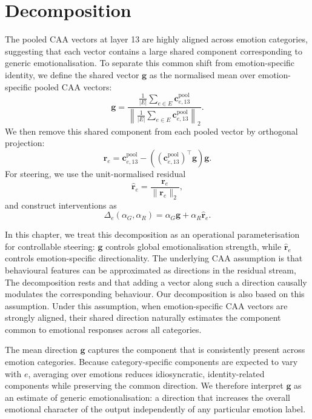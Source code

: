 \section{Decomposition}
\label{sec:decomposition}

The pooled CAA vectors at layer 13 are highly aligned across emotion categories, suggesting that each vector contains a large shared component corresponding to generic emotionalisation. To separate this common shift from emotion-specific identity, we define the shared vector $\mathbf{g}$ as the normalised mean over emotion-specific pooled CAA vectors:
\[
\mathbf{g}=
\frac{\frac{1}{|E|}\sum_{e\in E}\mathbf{c}^{\mathrm{pool}}_{e,13}}
{\left\lVert\frac{1}{|E|}\sum_{e\in E}\mathbf{c}^{\mathrm{pool}}_{e,13}\right\rVert_2}.
\]
We then remove this shared component from each pooled vector by orthogonal projection:
\[
\mathbf{r}_e=\mathbf{c}^{\mathrm{pool}}_{e,13}-\left((\mathbf{c}^{\mathrm{pool}}_{e,13})^\top \mathbf{g}\right)\mathbf{g}.
\]
For steering, we use the unit-normalised residual
\[
\hat{\mathbf{r}}_e=\frac{\mathbf{r}_e}{\lVert\mathbf{r}_e\rVert_2},
\]
and construct interventions as
\[
\Delta_e(\alpha_G,\alpha_R)=\alpha_G\mathbf{g}+\alpha_R\hat{\mathbf{r}}_e.
\]

In this chapter, we treat this decomposition as an operational parameterisation for controllable steering: $\mathbf{g}$ controls global emotionalisation strength, while $\hat{\mathbf{r}}_e$ controls emotion-specific directionality. 
The underlying CAA assumption is that behavioural features can be approximated as directions in the residual stream, The decomposition rests and that adding a vector along such a direction causally modulates the corresponding behaviour. Our decomposition is also based on this assumption. Under this assumption, when emotion-specific CAA vectors are strongly aligned, their shared direction naturally estimates the component common to emotional responses across all categories.\par

The mean direction $\mathbf{g}$ captures the component that is consistently present across emotion categories. Because category-specific components are expected to vary with $e$, averaging over emotions reduces idiosyncratic, identity-related components while preserving the common direction. We therefore interpret $\mathbf{g}$ as an estimate of generic emotionalisation: a direction that increases the overall emotional character of the output independently of any particular emotion label.\par

